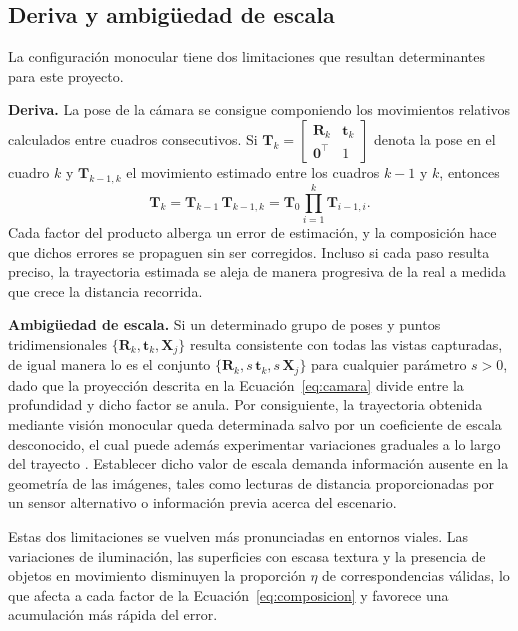 \subsection{Deriva y ambigüedad de escala}
\label{sec:escala}

La configuración monocular tiene dos limitaciones que resultan determinantes para este proyecto.

\textbf{Deriva.}
La pose de la cámara se consigue componiendo los movimientos relativos calculados entre cuadros consecutivos.
Si $\mathbf{T}_k = \left[\begin{smallmatrix}\mathbf{R}_k & \mathbf{t}_k\\ \mathbf{0}^{\top} & 1\end{smallmatrix}\right]$ denota la pose en el cuadro $k$ y $\mathbf{T}_{k-1,k}$ el movimiento estimado entre los cuadros $k-1$ y $k$, entonces \cite{scaramuzza2011vo}
\begin{equation}
\mathbf{T}_k = \mathbf{T}_{k-1}\,\mathbf{T}_{k-1,k} = \mathbf{T}_0 \prod_{i=1}^{k} \mathbf{T}_{i-1,i}.
\label{eq:composicion}
\end{equation}
Cada factor del producto alberga un error de estimación, y la composición hace que dichos errores se propaguen sin ser corregidos.
Incluso si cada paso resulta preciso, la trayectoria estimada se aleja de manera progresiva de la real a medida que crece la distancia recorrida.

\textbf{Ambigüedad de escala.}
Si un determinado grupo de poses y puntos tridimensionales $\{\mathbf{R}_k, \mathbf{t}_k, \mathbf{X}_j\}$ resulta consistente con todas las vistas capturadas, de igual manera lo es el conjunto $\{\mathbf{R}_k, s\,\mathbf{t}_k, s\,\mathbf{X}_j\}$ para cualquier parámetro $s>0$, dado que la proyección descrita en la Ecuación~\eqref{eq:camara} divide entre la profundidad y dicho factor se anula.
Por consiguiente, la trayectoria obtenida mediante visión monocular queda determinada salvo por un coeficiente de escala desconocido, el cual puede además experimentar variaciones graduales a lo largo del trayecto \cite{murartal2015orbslam,scaramuzza2011vo}.
Establecer dicho valor de escala demanda información ausente en la geometría de las imágenes, tales como lecturas de distancia proporcionadas por un sensor alternativo o información previa acerca del escenario.

Estas dos limitaciones se vuelven más pronunciadas en entornos viales.
Las variaciones de iluminación, las superficies con escasa textura y la presencia de objetos en movimiento disminuyen la proporción $\eta$ de correspondencias válidas, lo que afecta a cada factor de la Ecuación~\eqref{eq:composicion} y favorece una acumulación más rápida del error.

